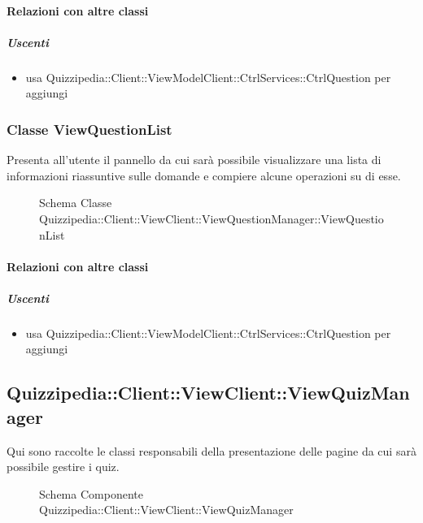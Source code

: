\paragraph{Relazioni con altre classi}
\subparagraph{Uscenti}
\begin{itemize}
\item usa Quizzipedia::Client::ViewModelClient::CtrlServices::CtrlQuestion per aggiungi
\end{itemize}
\subsubsection{Classe ViewQuestionList}
Presenta all'utente il pannello da cui sarà possibile visualizzare una lista di informazioni riassuntive sulle domande e compiere alcune operazioni su di esse.
\begin{figure}[H]
\centering
\noindent{}
\caption[Schema Classe ViewQuestionList]{Schema Classe Quizzipedia::Client::ViewClient::ViewQuestionManager::ViewQuestionList}
\end{figure}
\paragraph{Relazioni con altre classi}
\subparagraph{Uscenti}
\begin{itemize}
\item usa Quizzipedia::Client::ViewModelClient::CtrlServices::CtrlQuestion per aggiungi
\end{itemize}
\subsection{Quizzipedia::Client::ViewClient::ViewQuizManager}
Qui sono raccolte le classi responsabili della presentazione delle pagine da cui sarà possibile gestire i quiz.
\begin{figure}[H]
\centering
\noindent{}
\caption[Schema Componente Quizzipedia::Client::ViewClient::ViewQuizManager]{Schema Componente Quizzipedia::Client::ViewClient::ViewQuizManager}
\end{figure}
